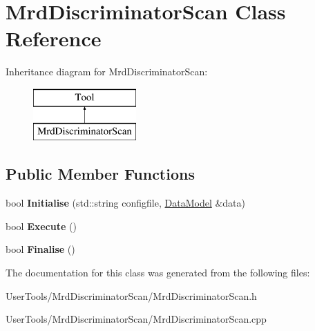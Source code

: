 \hypertarget{classMrdDiscriminatorScan}{\section{Mrd\-Discriminator\-Scan Class Reference}
\label{classMrdDiscriminatorScan}
}
Inheritance diagram for Mrd\-Discriminator\-Scan\-:\begin{figure}[H]
\begin{center}
\leavevmode
\includegraphics[height=2.000000cm]{classMrdDiscriminatorScan}
\end{center}
\end{figure}
\subsection*{Public Member Functions}
\begin{DoxyCompactItemize}
\item 
\hypertarget{classMrdDiscriminatorScan_abaa4b337b0df9e14620ae6f9b8794b1b}{bool {\bfseries Initialise} (std\-::string configfile, \hyperlink{classDataModel}{Data\-Model} \&data)}\label{classMrdDiscriminatorScan_abaa4b337b0df9e14620ae6f9b8794b1b}

\item 
\hypertarget{classMrdDiscriminatorScan_a37ebf1bcfc1bdaafe1afddea5bacbd67}{bool {\bfseries Execute} ()}\label{classMrdDiscriminatorScan_a37ebf1bcfc1bdaafe1afddea5bacbd67}

\item 
\hypertarget{classMrdDiscriminatorScan_a73fe6971470c0858f87051e2ab853e18}{bool {\bfseries Finalise} ()}\label{classMrdDiscriminatorScan_a73fe6971470c0858f87051e2ab853e18}

\end{DoxyCompactItemize}


The documentation for this class was generated from the following files\-:\begin{DoxyCompactItemize}
\item 
User\-Tools/\-Mrd\-Discriminator\-Scan/Mrd\-Discriminator\-Scan.\-h\item 
User\-Tools/\-Mrd\-Discriminator\-Scan/Mrd\-Discriminator\-Scan.\-cpp\end{DoxyCompactItemize}
